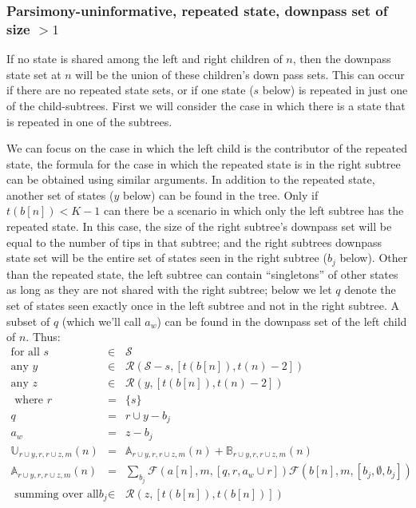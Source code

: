 \documentclass[11pt]{article}
\newcommand{\numStates}{\ensuremath{K}\xspace}
\newcommand{\allStates}{\ensuremath{\mathcal S}\xspace}
\newcommand{\probUninformPatClassSym}{\ensuremath{\mathbb U}\xspace}
\newcommand{\generalProbUninformPatClass}[6]{\ensuremath{{\mathbb #6}_{#1,#2,#3,#4}\left(#5\right)}\xspace}
\newcommand{\probUninformPatClass}[5]{\ensuremath{\probUninformPatClassSym_{#1,#2,#3,#4}\left(#5\right)}\xspace}
\newcommand{\leftChild}[1]{\ensuremath{a\left[#1\right]}\xspace} %
\newcommand{\rightChild}[1]{\ensuremath{b\left[#1\right]}\xspace}%
\newcommand{\numLeaves}[1]{\ensuremath{t\left(#1\right)}\xspace}
\newcommand{\subsetsOfSizeSet}[3]{\ensuremath{\mathcal R}\left(#1,\left[#2,#3\right]\right)\xspace}
\newcommand{\FelsensteinPruneSym}{{\mathcal{F}}}
\newcommand{\FelsensteinPruneUninform}[5]{\FelsensteinPruneSym(#1,#2,\left[#3,#4,#5\right])}
\begin{document}
\subsubsection{Parsimony-uninformative, repeated state, downpass set of size $> 1$}
If no state is shared among the left and right children of $n$, then the downpass state set at $n$ will be the union of these children's down pass sets.
This can occur if there are no repeated state sets, or if one state ($s$ below) is repeated in just one of the child-subtrees.
First we will consider the case in which there is a state that is repeated in one of the subtrees.

We can focus on the case in which the left child is the contributor of the repeated state, the formula for the case in which the repeated state is in the right subtree can be obtained using similar arguments.
In addition to the repeated state, another set of states ($y$ below) can be found in the tree.
Only if $\numLeaves{\rightChild{n}} < \numStates - 1$ can there be a scenario in which only the left subtree has the repeated state.
In this case, the size of the right subtree's downpass set will be equal to the number of tips in that subtree; and the right subtrees downpass state set will be the entire set of states seen in the right subtree ($b_j$ below).
Other than the repeated state, the left subtree can contain ``singletons'' of other states as long as they are not shared with the right subtree; below we let $q$ denote the set of states seen exactly once in the left subtree and not in the right subtree.
A subset of $q$ (which we'll call $a_w$) can be found in the downpass set of the left child of $n$.
Thus:
\begin{eqnarray*}
\mbox{for all } s & \in &  \allStates\\
\mbox{any } y & \in &  \subsetsOfSizeSet{\allStates-s}{\numLeaves{\rightChild{n}}}{\numLeaves{n} - 2}\\
\mbox{any } z & \in &  \subsetsOfSizeSet{y}{\numLeaves{\rightChild{n}}}{\numLeaves{n} - 2}\\
\mbox{ where }r & =&  \{s\}   \nonumber \\
q &  = & r \cup y - b_j\\
a_w & = & z-b_j\\
\probUninformPatClass{r\cup y }{r}{r\cup z}{m}{n} & = & \generalProbUninformPatClass{r\cup y }{r}{r\cup z}{m}{n}{A} +\generalProbUninformPatClass{r\cup y }{r}{r\cup z}{m}{n}{B}  \\
\generalProbUninformPatClass{r\cup y }{r}{r\cup z}{m}{n}{A} & = & \sum_{b_j}\FelsensteinPruneUninform{\leftChild{n}}{m}{q}{r}{a_w\cup r } \FelsensteinPruneUninform{\rightChild{n}}{m}{b_j}{\emptyset}{b_j}\\
\mbox{ summing over all } b_j & \in & \subsetsOfSizeSet{z}{\numLeaves{\rightChild{n}}}{\numLeaves{\rightChild{n}}} \\
\end{eqnarray*}
\end{document}
